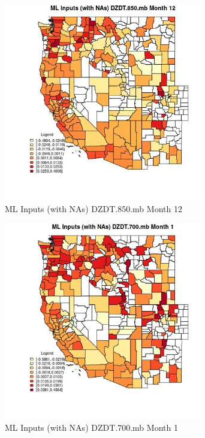 \begin{figure} 
\centering  
\includegraphics[width=0.77\textwidth]{Code_Outputs/Report_ML_input_PM25_Step4_part_f_de_duplicated_aveswNAs_CountyDZDT850mbmedianMonth12.jpg} 
\caption{\label{fig:Report_ML_input_PM25_Step4_part_f_de_duplicated_aveswNAsCountyDZDT850mbmedianMonth12}ML Inputs (with NAs) DZDT.850.mb Month 12} 
\end{figure} 
 

\begin{figure} 
\centering  
\includegraphics[width=0.77\textwidth]{Code_Outputs/Report_ML_input_PM25_Step4_part_f_de_duplicated_aveswNAs_CountyDZDT700mbmedianMonth1.jpg} 
\caption{\label{fig:Report_ML_input_PM25_Step4_part_f_de_duplicated_aveswNAsCountyDZDT700mbmedianMonth1}ML Inputs (with NAs) DZDT.700.mb Month 1} 
\end{figure} 
 

